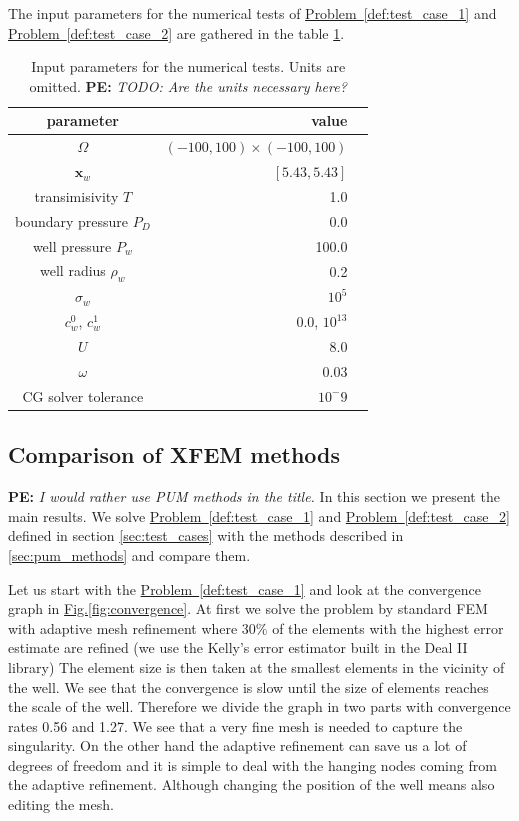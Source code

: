 \documentclass[preprint,12pt]{elsarticle}
\newcommand{\probref}[1]{\hyperref[#1]{Problem~\ref{#1}}}
\newcommand{\fig}[1]{\hyperref[#1]{Fig.\ref{#1}}}
\def\vc#1{\mathbf{\boldsymbol{#1}}}     %
\newcommand{\notePE}[1]{{\color{Orange} \textbf{PE: } \textit{#1}}}
\begin{document}
The input parameters for the numerical tests of \probref{def:test_case_1} and \probref{def:test_case_2} 
are gathered in the table \ref{tab:parameters}.
%
\begin{table}[!ht]
\begin{center}
\begin{tabular}{crr}
\toprule
parameter    & value \\
\midrule
$\Omega$   & $(-100,100)\times(-100,100)$   \\
$\vc{x}_w$  & $[5.43,5.43]$   \\
transimisivity $T$          & 1.0   \\
boundary pressure $P_D$     & 0.0   \\
well pressure $P_w$         & 100.0 \\
well radius $\rho_w$        & 0.2 \\
$\sigma_w$                  & $10^5$ \\
$c_w^0$, $c_w^1$            & 0.0, $10^{13}$ \\
$U$                         & 8.0 \\
$\omega$                    & 0.03 \\
CG solver tolerance         & $10^-9$ \\
\bottomrule
\end{tabular}
\caption{Input parameters for the numerical tests. Units are omitted.
\notePE{TODO: Are the units necessary here?}}
\label{tab:parameters}
\end{center}
\end{table}
%

\subsection{Comparison of XFEM methods}
\notePE{I would rather use PUM methods in the title.}
In this section we present the main results. We solve \probref{def:test_case_1} and \probref{def:test_case_2} 
defined in section \ref{sec:test_cases} with the methods described in \ref{sec:pum_methods} and compare them.

Let us start with the \probref{def:test_case_1} and look at the convergence graph in \fig{fig:convergence}.
At first we solve the problem by standard FEM with adaptive mesh refinement where 30\% of the elements
with the highest error estimate are refined (we use the Kelly's error estimator built in the Deal II library)
The element size is then taken at the smallest elements in the 
vicinity of the well. We see that the convergence is slow until the size of elements reaches the scale of the
well. Therefore we divide the graph in two parts with convergence rates 0.56 and 1.27.
We see that a very fine mesh is needed to capture the singularity.
On the other hand the adaptive refinement can save us a lot of degrees of freedom and it is simple to deal 
with the hanging nodes coming from the adaptive refinement. Although changing the position of the well means
also editing the mesh.
\end{document}
